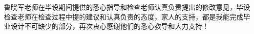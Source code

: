 
\thesisacknowledgement

鲁晓军老师在毕设期间提供的悉心指导和检查老师认真负责提出的修改意见，毕设检查老师在检查过程中提的建议和认真负责的态度，家人的支持，都是我能完成毕业设计不可缺少的部分，再次衷心感谢他们的悉心教导和大力支持！

